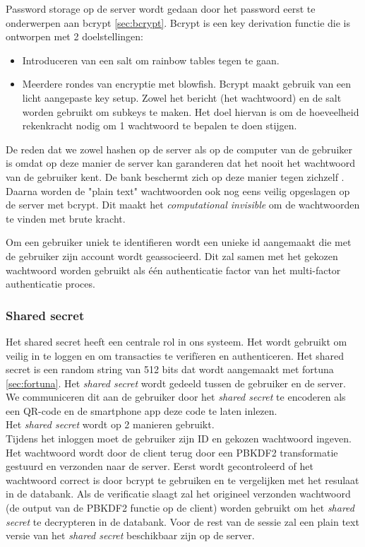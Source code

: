 \documentclass[11pt]{article}
\begin{document}
Password storage op de server wordt gedaan door het password eerst te onderwerpen aan bcrypt \ref{sec:bcrypt}. Bcrypt is een key derivation functie die is ontworpen met 2 doelstellingen:
\begin{itemize}
\item Introduceren van een salt om rainbow tables tegen te gaan.
\item Meerdere rondes van encryptie met blowfish. Bcrypt maakt gebruik van een licht aangepaste key setup. Zowel het bericht (het wachtwoord) en de salt worden gebruikt om subkeys te maken. Het doel hiervan is om de hoeveelheid rekenkracht nodig om 1 wachtwoord te bepalen te doen stijgen. 
\end{itemize}
De reden dat we zowel hashen op de server als op de computer van de gebruiker is omdat op deze manier de server kan garanderen dat het nooit het wachtwoord van de gebruiker kent. De bank beschermt zich op deze manier tegen zichzelf \cite{pw_habit}. Daarna worden de "plain text" wachtwoorden ook nog eens veilig opgeslagen op de server met bcrypt\cite{bcrypt}. Dit maakt het \emph{computational invisible} om de wachtwoorden te vinden met brute kracht.

Om een gebruiker uniek te identifieren wordt een unieke id aangemaakt die met de gebruiker zijn account wordt geassocieerd. Dit zal samen met het gekozen wachtwoord worden gebruikt als \'e\'en authenticatie factor van het multi-factor authenticatie proces.
	
\subsubsection{Shared secret}
Het shared secret heeft een centrale rol in ons systeem. Het wordt gebruikt om veilig in te loggen en om transacties te verif\"ieren en authenticeren. Het shared secret is een random string van 512 bits dat wordt aangemaakt met fortuna \ref{sec:fortuna}. 
Het \emph{shared secret} wordt gedeeld tussen de gebruiker en de server. We communiceren dit aan de gebruiker door het \emph{shared secret} te encoderen als een QR-code en de smartphone app deze code te laten inlezen.\\
Het \emph{shared secret} wordt op 2 manieren gebruikt. \\
Tijdens het inloggen moet de gebruiker zijn ID en gekozen wachtwoord ingeven. Het wachtwoord wordt door de client terug door een PBKDF2 transformatie gestuurd en verzonden naar de server. Eerst wordt gecontroleerd of het wachtwoord correct is door bcrypt te gebruiken en te vergelijken met het resulaat in de databank. Als de verificatie slaagt zal het origineel verzonden wachtwoord (de output van de PBKDF2 functie op de client) worden gebruikt om het \emph{shared secret} te decrypteren in de databank. Voor de rest van de sessie zal een  plain text versie van het \emph{shared secret} beschikbaar zijn op de server.
\end{document}
